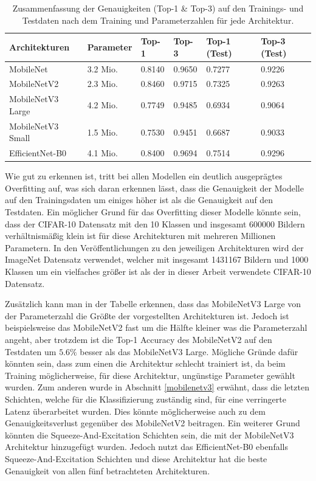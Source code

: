 \begin{table}[ht]
\centering
\begin{tabular}{llllll}
\toprule
    Architekturen & Parameter &  Top-1 &  Top-3 &  Top-1 (Test) &  Top-3 (Test) \\
\midrule
        MobileNet &  3.2 Mio. & 0.8140 & 0.9650 &        0.7277 &        0.9226 \\
      MobileNetV2 &  2.3 Mio. & 0.8460 & 0.9715 &        0.7325 &        0.9263 \\
MobileNetV3 Large &  4.2 Mio. & 0.7749 & 0.9485 &        0.6934 &        0.9064 \\
MobileNetV3 Small &  1.5 Mio. & 0.7530 & 0.9451 &        0.6687 &        0.9033 \\
  EfficientNet-B0 &  4.1 Mio. & 0.8400 & 0.9694 &        0.7514 &        0.9296 \\
\bottomrule
\end{tabular}
\caption{Zusammenfassung der Genauigkeiten (Top-1 \& Top-3) auf den Trainings- und Testdaten nach dem Training und Parameterzahlen für jede Architektur.}
\label{t4.1}
\end{table}

Wie gut zu erkennen ist, tritt bei allen Modellen ein deutlich ausgeprägtes Overfitting auf, was sich daran erkennen lässt, dass die Genauigkeit der Modelle auf den Trainingsdaten um einiges höher ist als die Genauigkeit auf den Testdaten. Ein möglicher Grund für das Overfitting dieser Modelle könnte sein, dass der CIFAR-10 Datensatz mit den 10 Klassen und insgesamt 600000 Bildern verhältnismäßig klein ist für diese Architekturen mit mehreren Millionen Parametern. In den Veröffentlichungen zu den jeweiligen Architekturen \cite{howard_mobilenets_2017, sandler_mobilenetv2_2019, howard_searching_2019, tan_efficientnet_2020} wird der ImageNet Datensatz \cite{russakovsky_imagenet_2015} verwendet, welcher mit insgesamt 1431167 Bildern und 1000 Klassen um ein vielfaches größer ist als der in dieser Arbeit verwendete CIFAR-10 Datensatz.

Zusätzlich kann man in der Tabelle erkennen, dass das MobileNetV3 Large von der Parameterzahl die Größte der vorgestellten Architekturen ist. Jedoch ist beispielsweise das MobileNetV2 fast um die Hälfte kleiner was die Parameterzahl angeht, aber trotzdem ist die Top-1 Accuracy des MobileNetV2 auf den Testdaten um $5.6\%$ besser als das MobileNetV3 Large. Mögliche Gründe dafür könnten sein, dass zum einen die Architektur schlecht trainiert ist, da beim Training möglicherweise, für diese Architektur, ungünstige Parameter gewählt wurden. Zum anderen wurde in Abschnitt \ref{mobilenetv3} erwähnt, dass die letzten Schichten, welche für die Klassifizierung zuständig sind, für eine verringerte Latenz überarbeitet wurden. Dies könnte möglicherweise auch zu dem Genauigkeitsverlust gegenüber des MobileNetV2 beitragen. Ein weiterer Grund könnten die Squeeze-And-Excitation Schichten sein, die mit der MobileNetV3 Architektur hinzugefügt wurden. Jedoch nutzt das EfficientNet-B0 ebenfalls Squeeze-And-Excitation Schichten und diese Architektur hat die beste Genauigkeit von allen fünf betrachteten Architekturen.

